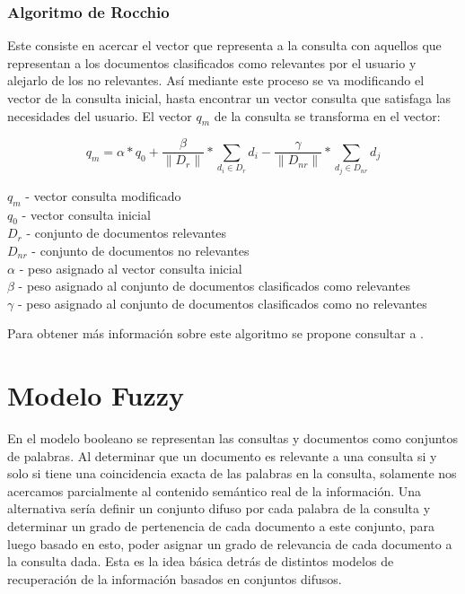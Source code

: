 \documentclass{llncs}
\begin{document}
    \subsubsection{Algoritmo de Rocchio} 
        
    Este consiste en acercar el vector que representa a la consulta con aquellos que representan a los documentos clasificados como relevantes por el usuario y alejarlo de los no relevantes. Así mediante este proceso se va modificando el vector de la consulta inicial, hasta encontrar un vector consulta que satisfaga las necesidades del usuario. El vector $q_m$ de la consulta se transforma en el vector:

    \begin{equation}
        q_m = \alpha * q_0 + \frac{\beta}{\| D_r \|} *  \sum_{d_i \in D_r} d_i - \frac{\gamma}{\| D_{nr} \|} *  \sum_{d_j \in D_{nr}} d_j
    \end{equation}

    \begin{center}
        $q_m$ - vector consulta modificado\\
        $q_0$ - vector consulta inicial\\
        $D_r$ - conjunto de documentos relevantes\\
        $D_{nr}$ - conjunto de documentos no relevantes\\
        $\alpha$ - peso asignado al vector consulta inicial\\
        $\beta$ - peso asignado al conjunto de documentos clasificados como relevantes\\
        $\gamma$ - peso asignado al conjunto de documentos clasificados como no relevantes\\
    \end{center}

    Para obtener más información sobre este algoritmo se propone consultar a \cite[epígrafe 9.1.1]{B1}.
	
	\section{Modelo Fuzzy}
	
		En el modelo booleano se representan las consultas y documentos como conjuntos de palabras. Al determinar que un documento es relevante a una consulta si y solo si tiene una coincidencia exacta de las palabras en la consulta, solamente nos acercamos parcialmente al contenido sem\'antico real de la informaci\'on. Una alternativa ser\'ia definir un conjunto difuso por cada palabra de la consulta y determinar un grado de pertenencia de cada documento a este conjunto, para luego basado en esto, poder asignar un grado de relevancia de cada documento a la consulta dada. Esta es la idea b\'asica detr\'as de distintos modelos de recuperaci\'on de la informaci\'on basados en conjuntos difusos. 
		
\end{document}
